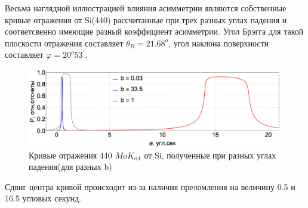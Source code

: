 Весьма наглядной иллюстрацией влияния асимметрии являются собственные
кривые отражения от Si(440) рассчитанные при
трех разных углах падения и соответсвенно имеющие разный коэффициент асимметрии. Угол
Брэгга для такой плоскости отражения составляет $\theta_B = 21.68^o$, угол наклона поверхности
составляет $\varphi = 20^o 53^{'}$.

\begin{figure}[H]
\centering
\includegraphics[width=0.99\textwidth]{images/rocking_curve_assym_3.png}
\caption{Кривые отражения 440 $MoK_{\alpha 1}$ от Si, полученные при разных углах падения(для разных b)}
\label{ris:rocking_curve_assym_3}
\end{figure}
Сдвиг центра кривой происходит из-за наличия преломления на величину 0.5 и 16.5 угловых секунд.
%
